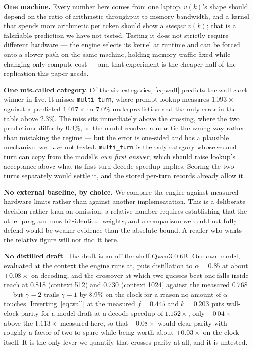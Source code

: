 \documentclass[conference]{IEEEtran}
\begin{document}
\textbf{One machine.} Every number here comes from one laptop. $v(k)$'s shape should depend on the
ratio of arithmetic throughput to memory bandwidth, and a kernel that spends more arithmetic per
token should show a \emph{steeper} $v(k)$; that is a falsifiable prediction we have not tested.
Testing it does not strictly require different hardware --- the engine selects its kernel at runtime
and can be forced onto a slower path on the same machine, holding memory traffic fixed while
changing only compute cost --- and that experiment is the cheaper half of the replication this paper
needs.

\textbf{One mis-called category.} Of the six categories, \eqref{eq:wall} predicts the wall-clock
winner in five. It misses \texttt{multi\_turn}, where prompt lookup measures $1.093\times$ against a
predicted $1.017\times$: a $7.0\%$ underprediction and the only error in the table above $2.3\%$. The
miss sits immediately above the crossing, where the two predictions differ by $0.9\%$, so the model
resolves a near-tie the wrong way rather than mistaking the regime --- but the error is one-sided and
has a plausible mechanism we have not tested. \texttt{multi\_turn} is the only category whose second
turn can copy from the model's \emph{own first answer}, which should raise lookup's acceptance above
what its first-turn decode speedup implies. Scoring the two turns separately would settle it, and the
stored per-turn records already allow it.

\textbf{No external baseline, by choice.} We compare the engine against measured hardware limits
rather than against another implementation. This is a deliberate decision rather than an omission:
a relative number requires establishing that the other program runs bit-identical weights, and a
comparison we could not fully defend would be weaker evidence than the absolute bound. A reader who
wants the relative figure will not find it here.

\textbf{No distilled draft.} The draft is an off-the-shelf Qwen3-0.6B. Our own model, evaluated at the
context the engine runs at, puts distillation to $\alpha = 0.85$ at about $+0.08\times$ on decoding,
and the crossover at which two guesses beat one falls inside reach at 0.818 (context 512) and 0.730
(context 1024) against the measured 0.768 --- but $\gamma=2$ trails $\gamma=1$ by 8.9\% on the clock
for a reason no amount of $\alpha$ touches. Inverting~\eqref{eq:wall} at the measured $f = 0.445$ and
$k = 0.203$ puts wall-clock parity for a model draft at a decode speedup of $1.152\times$, only
$+0.04\times$ above the $1.113\times$ measured here, so that $+0.08\times$ would clear parity with
roughly a factor of two to spare while being worth about $+0.03\times$ on the clock itself. It is the
only lever we quantify that crosses parity at all, and it is untested.
\end{document}
